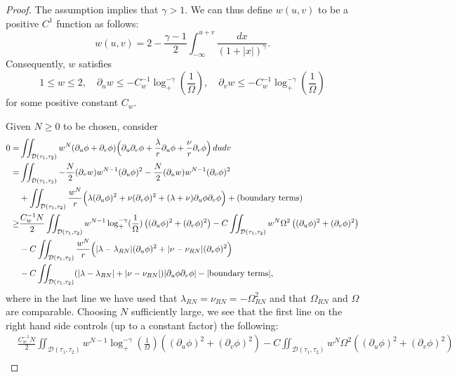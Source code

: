 \documentclass[10pt, reqno]{amsart}
\theoremstyle{definition}
\theoremstyle{remark}
\numberwithin{equation}{section}
\newcommand{\ud}{d}
\newcommand{\rd}{\partial}
\newcommand{\bb}{\Big}
\newcommand{\0}{\emptyset}
\newcommand{\lmb}{\lambda}
\newcommand{\Omg}{\Omega}
\newcommand{\calD}{\mathcal D}
\newcommand{\dur}{\nu}
\newcommand{\dvr}{\lmb}
\newcommand{\f}{\frac}
\begin{document}
\begin{proof} 
The assumption implies that $\gamma>1$. We can thus define $w(u,v)$ to be a positive $C^1$ function as follows:
$$w(u,v)=2-\f{\gamma-1}{2}\int_{-\infty}^{u+v} \f{dx}{(1+|x|)^{\gamma}}.$$
Consequently, $w$ satisfies
$$1\leq w\leq 2,\quad \rd_u w\leq -C_{w}^{-1}\log_+^{-\gamma}(\f 1{\Omg}),\quad \rd_v w\leq -C_{w}^{-1}\log_+^{-\gamma}(\f 1{\Omg})$$
for some positive constant $C_w$.

Given $N \geq 0$ to be chosen, consider
\begin{equation}\label{intr.ILED.bulk.main}
\begin{split}
	0 =& \iint_{\calD(\tau_{1}, \tau_{2})}	
			w^{N} (\rd_{u} \phi + \rd_{v} \phi) \bb( \rd_{u} \rd_{v} \phi + \frac{\dvr}{r} \rd_{u} \phi + \frac{\dur}{r} \rd_{v} \phi \bb) \, \ud u \ud v \\
	=& \iint_{\calD(\tau_{1}, \tau_{2})} - \frac{N}{2} (\rd_{v} w) w^{N-1} (\rd_{u} \phi)^{2} - \frac{N}{2} (\rd_{u} w) w^{N-1} (\rd_{v} \phi)^{2}\\
		& + \iint_{\calD(\tau_{1}, \tau_{2})} \f{w^{N}}{r} \bb( \lambda(\rd_{u} \phi)^{2} + \nu(\rd_{v} \phi)^{2} + (\dvr+\dur) \rd_{u} \phi \rd_{v} \phi \bb) + (\hbox{boundary terms})\\
	\geq & \f{C_{w}^{-1} N}2 \iint_{\calD(\tau_{1}, \tau_{2})} w^{N-1} \log_+^{-\gamma}(\f 1{\Omg}) \left((\rd_{u} \phi)^{2} + (\rd_{v} \phi)^{2}\right)-C \iint_{\calD(\tau_{1}, \tau_{2})} w^N \Omg^2\left( (\rd_u\phi)^2+(\rd_v\phi)^2\right)\\
	& -C \iint_{\calD(\tau_{1}, \tau_{2})} \f{w^{N}}{r} \bb( |\lambda-\lambda_{RN}|(\rd_{u} \phi)^{2} + |\nu-\nu_{RN}|(\rd_{v} \phi)^{2}\bb)\\
	&-C\iint_{\calD(\tau_{1}, \tau_{2})} (|\dvr-\dvr_{RN}|+|\nu-\nu_{RN}|) |\rd_{u} \phi \rd_{v} \phi| - |\hbox{boundary terms}|,
\end{split}
\end{equation}
where in the last line we have used that $\lambda_{RN}=\nu_{RN}=-\Omg^2_{RN}$ and that $\Omg_{RN}$ and $\Omg$ are comparable. 
Choosing $N$ sufficiently large, we see that the first line on the right hand side controls (up to a constant factor) the following:
\begin{equation}\label{intr.ILED.bulk.1}
\begin{split}
&\f{C_{w}^{-1} N}2 \iint_{\calD(\tau_{1}, \tau_{2})} w^{N-1} \log_+^{-\gamma}(\f 1{\Omg}) \left((\rd_{u} \phi)^{2} + (\rd_{v} \phi)^{2}\right)-C \iint_{\calD(\tau_{1}, \tau_{2})} w^N \Omg^2\left( (\rd_u\phi)^2+(\rd_v\phi)^2\right)\\

\end{split}
\end{equation}
\end{proof}
\end{document}
